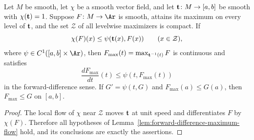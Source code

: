 \begin{proposition}
\label{prop:forward-difference-maximum}
\leanok
\label{fordiffmax}




Let $M$ be smooth, let $\chi$ be a smooth vector field, and let
${\bf t}\colon M\to[a,b]$ be smooth with $\chi({\bf t})=1$. Suppose
$F\colon M\to\Ar$ is smooth, attains its maximum on every level of
${\bf t}$, and the set $\mathcal Z$ of all levelwise maximizers is
compact. If
$$\chi(F)(x)\le\psi({\bf t}(x),F(x))\qquad(x\in\mathcal Z),$$
where $\psi\in C^1([a,b]\times\Ar)$, then
$F_{\max}(t)=\max_{{\bf t}^{-1}(t)}F$ is continuous and satisfies
$$\frac{dF_{\max}}{dt}(t)\le\psi(t,F_{\max}(t))$$
in the forward-difference sense. If $G'=\psi(t,G)$ and
$F_{\max}(a)\le G(a)$, then $F_{\max}\le G$ on $[a,b]$.
\end{proposition}
\begin{proof}
\sketch
\leanok
{}
The local flow of $\chi$ near $\mathcal Z$ moves ${\bf t}$ at unit
speed and differentiates $F$ by $\chi(F)$. Therefore all hypotheses of
Lemma~\ref{lem:forward-difference-maximum-flow} hold, and its conclusions
are exactly the assertions.
\end{proof}
